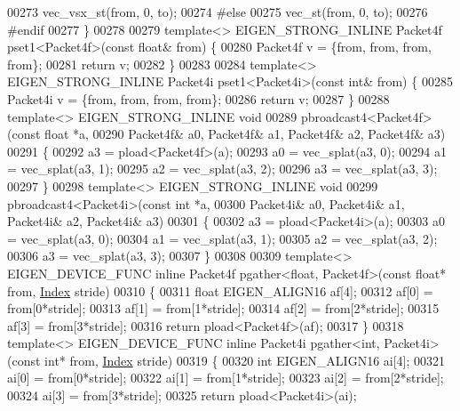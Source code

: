\begin{DoxyCode}
{00273   vec\_vsx\_st(from, 0, to);
00274 \textcolor{preprocessor}{#else}
00275   vec\_st(from, 0, to);
00276 \textcolor{preprocessor}{#endif}
00277 \}
00278 
00279 \textcolor{keyword}{template}<> EIGEN\_STRONG\_INLINE Packet4f pset1<Packet4f>(\textcolor{keyword}{const} \textcolor{keywordtype}{float}&  from) \{
00280   Packet4f v = \{from, from, from, from\};
00281   \textcolor{keywordflow}{return} v;
00282 \}
00283 
00284 \textcolor{keyword}{template}<> EIGEN\_STRONG\_INLINE Packet4i pset1<Packet4i>(\textcolor{keyword}{const} \textcolor{keywordtype}{int}&    from)   \{
00285   Packet4i v = \{from, from, from, from\};
00286   \textcolor{keywordflow}{return} v;
00287 \}
00288 \textcolor{keyword}{template}<> EIGEN\_STRONG\_INLINE \textcolor{keywordtype}{void}
00289 pbroadcast4<Packet4f>(\textcolor{keyword}{const} \textcolor{keywordtype}{float} *a,
00290                       Packet4f& a0, Packet4f& a1, Packet4f& a2, Packet4f& a3)
00291 \{
00292   a3 = pload<Packet4f>(a);
00293   a0 = vec\_splat(a3, 0);
00294   a1 = vec\_splat(a3, 1);
00295   a2 = vec\_splat(a3, 2);
00296   a3 = vec\_splat(a3, 3);
00297 \}
00298 \textcolor{keyword}{template}<> EIGEN\_STRONG\_INLINE \textcolor{keywordtype}{void}
00299 pbroadcast4<Packet4i>(\textcolor{keyword}{const} \textcolor{keywordtype}{int} *a,
00300                       Packet4i& a0, Packet4i& a1, Packet4i& a2, Packet4i& a3)
00301 \{
00302   a3 = pload<Packet4i>(a);
00303   a0 = vec\_splat(a3, 0);
00304   a1 = vec\_splat(a3, 1);
00305   a2 = vec\_splat(a3, 2);
00306   a3 = vec\_splat(a3, 3);
00307 \}
00308 
00309 \textcolor{keyword}{template}<> EIGEN\_DEVICE\_FUNC \textcolor{keyword}{inline} Packet4f pgather<float, Packet4f>(\textcolor{keyword}{const} \textcolor{keywordtype}{float}* from, 
      \hyperlink{namespace_eigen_a62e77e0933482dafde8fe197d9a2cfde}{Index} stride)
00310 \{
00311   \textcolor{keywordtype}{float} EIGEN\_ALIGN16 af[4];
00312   af[0] = from[0*stride];
00313   af[1] = from[1*stride];
00314   af[2] = from[2*stride];
00315   af[3] = from[3*stride];
00316  \textcolor{keywordflow}{return} pload<Packet4f>(af);
00317 \}
00318 \textcolor{keyword}{template}<> EIGEN\_DEVICE\_FUNC \textcolor{keyword}{inline} Packet4i pgather<int, Packet4i>(\textcolor{keyword}{const} \textcolor{keywordtype}{int}* from, 
      \hyperlink{namespace_eigen_a62e77e0933482dafde8fe197d9a2cfde}{Index} stride)
00319 \{
00320   \textcolor{keywordtype}{int} EIGEN\_ALIGN16 ai[4];
00321   ai[0] = from[0*stride];
00322   ai[1] = from[1*stride];
00323   ai[2] = from[2*stride];
00324   ai[3] = from[3*stride];
00325  \textcolor{keywordflow}{return} pload<Packet4i>(ai);
}
\end{DoxyCode}
